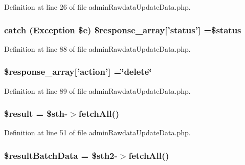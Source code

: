 Definition at line 26 of file admin\-Rawdata\-Update\-Data.\-php.

\hypertarget{admin_rawdata_update_data_8php_a8452fb8131316637a04e25f5fde066d9}{
\subsubsection[{\$response\-\_\-array}]{\setlength{\rightskip}{0pt plus 5cm}catch (Exception \$e) \$response\-\_\-array\mbox{[}'status'\mbox{]} =\$status}}\label{admin_rawdata_update_data_8php_a8452fb8131316637a04e25f5fde066d9}


Definition at line 88 of file admin\-Rawdata\-Update\-Data.\-php.

\hypertarget{admin_rawdata_update_data_8php_ae768978a0cdc416c0d63d798c85c8784}{
\subsubsection[{\$response\-\_\-array}]{\setlength{\rightskip}{0pt plus 5cm}\$response\-\_\-array\mbox{[}'action'\mbox{]} =\char`\"{}delete\char`\"{}}}\label{admin_rawdata_update_data_8php_ae768978a0cdc416c0d63d798c85c8784}


Definition at line 89 of file admin\-Rawdata\-Update\-Data.\-php.

\hypertarget{admin_rawdata_update_data_8php_a112ef069ddc0454086e3d1e6d8d55d07}{
\subsubsection[{\$result}]{\setlength{\rightskip}{0pt plus 5cm}\$result = \$sth-\/$>$fetch\-All()}}\label{admin_rawdata_update_data_8php_a112ef069ddc0454086e3d1e6d8d55d07}


Definition at line 51 of file admin\-Rawdata\-Update\-Data.\-php.

\hypertarget{admin_rawdata_update_data_8php_ae0a126caf328023cf68f759c1cfcc38f}{
\subsubsection[{\$result\-Batch\-Data}]{\setlength{\rightskip}{0pt plus 5cm}\$result\-Batch\-Data = \$sth2-\/$>$fetch\-All()}}\label{admin_rawdata_update_data_8php_ae0a126caf328023cf68f759c1cfcc38f}


